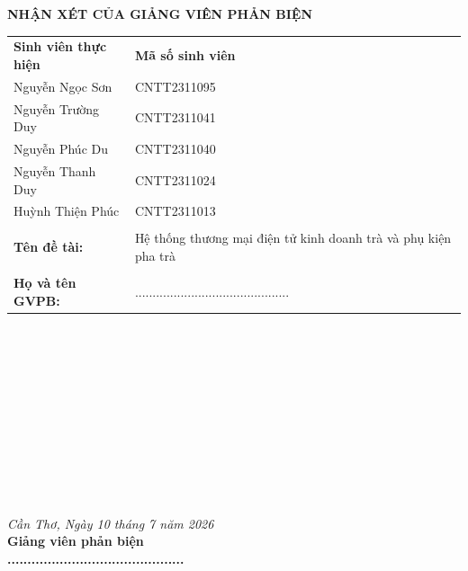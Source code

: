 \newpage
{}
{}

\begin{center}
    \textbf{\Large NHẬN XÉT CỦA GIẢNG VIÊN PHẢN BIỆN}
\end{center}

\vspace{1cm}

\begin{table}[h]
\begin{tabular}{ll}
\textbf{Sinh viên thực hiện} & \textbf{Mã số sinh viên} \\
Nguyễn Ngọc Sơn              & CNTT2311095              \\
Nguyễn Trường Duy            & CNTT2311041              \\
Nguyễn Phúc Du               & CNTT2311040              \\
Nguyễn Thanh Duy             & CNTT2311024              \\
Huỳnh Thiện Phúc             & CNTT2311013              \\
                            &                          \\
\textbf{Tên đề tài:}       & Hệ thống thương mại điện tử kinh doanh trà và phụ kiện pha trà \\
                            &                          \\
\textbf{Họ và tên GVPB:}   & ............................................     \\
\end{tabular}
\end{table}

\vspace{0.5cm}
\noindent\makebox[\linewidth]{\dotfill} \\
\noindent\makebox[\linewidth]{\dotfill} \\
\noindent\makebox[\linewidth]{\dotfill} \\
\noindent\makebox[\linewidth]{\dotfill} \\
\noindent\makebox[\linewidth]{\dotfill} \\
\noindent\makebox[\linewidth]{\dotfill} \\
\noindent\makebox[\linewidth]{\dotfill} \\
\noindent\makebox[\linewidth]{\dotfill} \\
\noindent\makebox[\linewidth]{\dotfill} \\
\noindent\makebox[\linewidth]{\dotfill} \\
\noindent\makebox[\linewidth]{\dotfill}

\vspace{1cm}

\begin{flushright}
    \textit{Cần Thơ, Ngày 10 tháng 7 năm 2026} \\
    \textbf{Giảng viên phản biện} \\
    \vspace{2cm}
    \textbf{............................................}
\end{flushright}